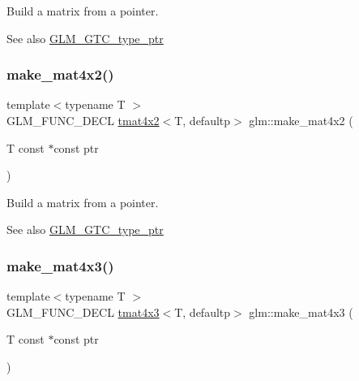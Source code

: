 Build a matrix from a pointer. \begin{DoxySeeAlso}{See also}
\hyperlink{group__gtc__type__ptr}{G\+L\+M\+\_\+\+G\+T\+C\+\_\+type\+\_\+ptr} 
\end{DoxySeeAlso}
\mbox{\label{group__gtc__type__ptr_ga967a5b934e67ff9a6d1d0d27a377a264}} 
\subsubsection{\texorpdfstring{make\+\_\+mat4x2()}{make\_mat4x2()}}
{\footnotesize\ttfamily template$<$typename T $>$ \\
G\+L\+M\+\_\+\+F\+U\+N\+C\+\_\+\+D\+E\+CL \hyperlink{structglm_1_1tmat4x2}{tmat4x2}$<$T, defaultp$>$ glm\+::make\+\_\+mat4x2 (\begin{DoxyParamCaption}\item[{T const $\ast$const}]{ptr }\end{DoxyParamCaption})}

Build a matrix from a pointer. \begin{DoxySeeAlso}{See also}
\hyperlink{group__gtc__type__ptr}{G\+L\+M\+\_\+\+G\+T\+C\+\_\+type\+\_\+ptr} 
\end{DoxySeeAlso}
\mbox{\label{group__gtc__type__ptr_ga4d42daced532b33cc672280e48670a51}} 
\subsubsection{\texorpdfstring{make\+\_\+mat4x3()}{make\_mat4x3()}}
{\footnotesize\ttfamily template$<$typename T $>$ \\
G\+L\+M\+\_\+\+F\+U\+N\+C\+\_\+\+D\+E\+CL \hyperlink{structglm_1_1tmat4x3}{tmat4x3}$<$T, defaultp$>$ glm\+::make\+\_\+mat4x3 (\begin{DoxyParamCaption}\item[{T const $\ast$const}]{ptr }\end{DoxyParamCaption})}

